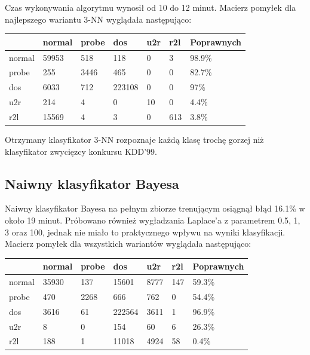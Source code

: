\documentclass[a4paper, 12pt]{article}
\begin{document}
Czas wykonywania algorytmu wynosił od 10 do 12 minut.
Macierz pomyłek dla najlepszego wariantu 3-NN wyglądała następująco:

\begin{table}[H]
\centering
\begin{tabular}{ | l | l | l | l | l | l | l | } \hline
	& normal & probe & dos 	& u2r 	& r2l 	& Poprawnych	\\ \hline
normal 	& 59953 & 518 	& 118	& 0	& 3 	& 98.9\% 	\\ \hline
probe 	& 255 	& 3446 	& 465	& 0	& 0 	& 82.7\% 	\\ \hline
dos 	& 6033 	& 712 	& 223108& 0 	& 0 	& 97\% 		\\ \hline
u2r 	& 214 	& 4 	& 0	& 10	& 0	& 4.4\%		\\ \hline
r2l 	& 15569 & 4 	& 3	& 0	& 613	& 3.8\%		\\ \hline
\end{tabular} 
\end{table}

Otrzymany klasyfikator 3-NN rozpoznaje każdą klasę trochę gorzej niż klasyfikator zwycięzcy
konkursu KDD'99.

\subsection{Naiwny klasyfikator Bayesa}

Naiwny klasyfikator Bayesa na pełnym zbiorze trenującym osiągnął błąd 16.1\% w około 19
minut.
Próbowano również wygładzania Laplace'a z parametrem 0.5, 1, 3 oraz 100, jednak
nie miało to praktycznego wpływu na wyniki klasyfikacji. Macierz pomyłek dla wszystkich
wariantów wyglądała następująco:

\begin{table}[H]
\centering
\begin{tabular}{ | l | l | l | l | l | l | l | } \hline
	& normal & probe & dos 	& u2r 	& r2l 	& Poprawnych	\\ \hline
normal 	& 35930 & 137 	& 15601	& 8777	& 147 	& 59.3\% 	\\ \hline
probe 	& 470 	& 2268 	& 666	& 762	& 0 	& 54.4\% 	\\ \hline
dos 	& 3616 	& 61 	& 222564& 3611 	& 1 	& 96.9\% 	\\ \hline
u2r 	& 8 	& 0 	& 154	& 60	& 6	& 26.3\%	\\ \hline
r2l 	& 188 	& 1 	& 11018	& 4924	& 58	& 0.4\%		\\ \hline
\end{tabular} 
\end{table}
\end{document}

